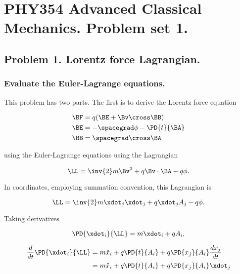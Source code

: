 
%

\chapter{PHY354 Advanced Classical Mechanics.  Problem set 1.}
\label{chap:classicalMechanicsPs1}
{}
\date{Jan 24, 2012}

\beginArtWithToc

\section{Problem 1.  Lorentz force Lagrangian.}
\subsection{Evaluate the Euler-Lagrange equations.}

This problem has two parts.   The first is to derive the Lorentz force equation

\begin{align}\label{eqn:classicalMechanicsPs1:20}
\BF &= q (\BE + \Bv \cross \BB) \\
\BE &= -\spacegrad \phi - \PD{t}{\BA} \\
\BB &= \spacegrad \cross \BA
\end{align}

using the Euler-Lagrange equations using the Lagrangian

\begin{equation}\label{eqn:classicalMechanicsPs1:40}
\LL = \inv{2} m \Bv^2 + q \Bv \cdot \BA - q \phi.
\end{equation}

In coordinates, employing summation convention, this Lagrangian is

\begin{equation}\label{eqn:classicalMechanicsPs1:60}
\LL = \inv{2} m \xdot_j \xdot_j + q \xdot_j A_j - q \phi.
\end{equation}

Taking derivatives

\begin{equation}\label{eqn:classicalMechanicsPs1:80}
\PD{\xdot_i}{\LL} = m \xdot_i + q A_i,
\end{equation}

\begin{align*}
\frac{d}{dt} \PD{\xdot_i}{\LL} 
&= 
m \ddot{x}_i 
+ q \PD{t}{A_i}
+ q \PD{x_j}{A_i} \frac{dx_j}{dt} \\
&=
m \ddot{x}_i 
+ q \PD{t}{A_i}
+ q \PD{x_j}{A_i} \xdot_j
\end{align*}

